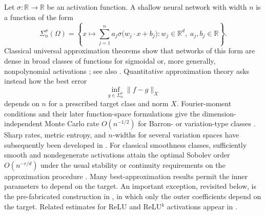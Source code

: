 \documentclass{article}
\numberwithin{equation}{section}
\def\RR{\mathbb{R}}
\begin{document}
Let $\sigma\colon\RR\to\RR$ be an activation function. A shallow neural network with width $n$ is a function of the form
\begin{equation}\label{eqn:shallow-network-class}
    \Sigma_{n}^\sigma(\Omega)
    =
    \left\{
        x\mapsto\sum_{j=1}^n a_j \sigma\big(w_j\cdot x + b_j\big)
        :
        w_j \in \mathbb R^d,\;
        a_j,b_j \in \mathbb R
    \right\}.
\end{equation}
Classical universal approximation theorems show that networks of this form are dense in broad classes of functions for sigmoidal or, more generally, nonpolynomial activations \cite{cybenko1989approximation,hornik1989multilayer,Hornik1991,leshno1993multilayer}; see also \cite{pinkus1999approximation,devore2021neural}. Quantitative approximation theory asks instead how the best error
\begin{equation*}
    \inf_{g\in\Sigma_n^\sigma}\|f-g\|_X
\end{equation*}
depends on $n$ for a prescribed target class and norm $X$. Fourier-moment conditions and their later function-space formulations give the dimension-independent Monte Carlo rate $O(n^{-1/2})$ for Barron- or variation-type classes \cite{barron1993universal,barron1994approximation,Jones1992,makovoz1996random,devore1996some,bach2017breaking,E2019barron,E2020representation,siegel2023characterization}. Sharp rates, metric entropy, and $n$-widths for several variation spaces have subsequently been developed in \cite{siegel2020approximation,siegel2022high,ma2022uniform,siegel2022sharp}. For classical smoothness classes, sufficiently smooth and nondegenerate activations attain the optimal Sobolev order $O(n^{-r/d})$ under the usual stability or continuity requirements on the approximation procedure \cite{mhaskar1993approximation,devore1989optimal,maiorov2000near}. Many best-approximation results permit the inner parameters to depend on the target. An important exception, revisited below, is the pre-fabricated construction in \cite{mhaskar1996neural}, in which only the outer coefficients depend on the target. Related estimates for ReLU and ReLU$^k$ activations appear in \cite{liu2024approximation,mao2023rates,mao2024approximation}.
\end{document}
